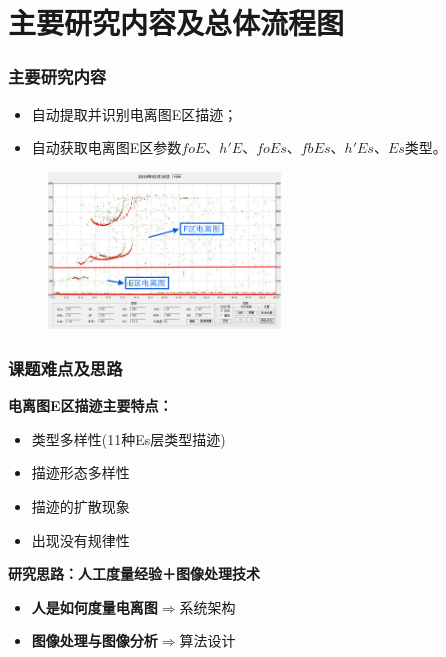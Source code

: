 \documentclass[notheorems,mathserif,table,compress]{beamer}  %
\begin{document}
\section{主要研究内容及总体流程图}
\begin{frame}
  \frametitle{主要研究内容}
   \begin{itemize}
  \item 自动提取并识别电离图E区描迹；
  \item 自动获取电离图E区参数$foE$、$h'E$、$foEs$、$fbEs$、$h'Es$、$Es$类型。
  \end{itemize}
  
  
  
  
 \begin{figure}[!htb] %
\centering
\includegraphics[width=0.55\textwidth]{分割图例.png}
\label{fig:2}
\end{figure}
\end{frame}


 
  \begin{frame}
\frametitle{课题难点及思路}
\color{blue}\textbf{电离图E区描迹主要特点：}
\begin{itemize}
\item [] 类型多样性(11种Es层类型描迹)
\item [] 描迹形态多样性
\item [] 描迹的扩散现象
\item [] 出现没有规律性
\end{itemize}
\pause
\color{blue}\textbf{研究思路：人工度量经验＋图像处理技术}
\begin{itemize}
\item [] \textbf{人是如何度量电离图}$\Rightarrow$系统架构
\item [] \textbf{图像处理与图像分析}$\Rightarrow$算法设计
\end{itemize}
\end{frame}
\end{document}
